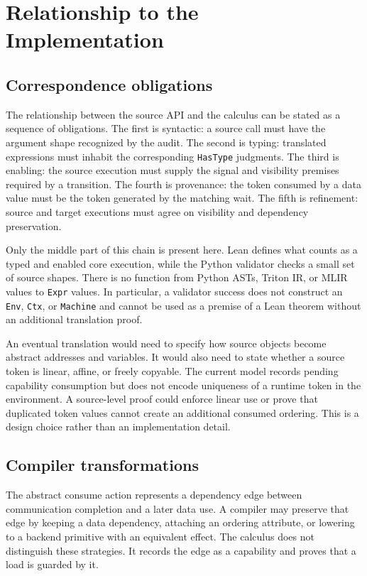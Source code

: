 \documentclass[a4paper,USenglish]{lipics-v2021}
\begin{document}
\section{Relationship to the Implementation}
\subsection{Correspondence obligations}
The relationship between the source API and the calculus can be stated as a
sequence of obligations. The first is syntactic: a source call must have the
argument shape recognized by the audit. The second is typing: translated
expressions must inhabit the corresponding \texttt{HasType} judgments. The
third is enabling: the source execution must supply the signal and visibility
premises required by a transition. The fourth is provenance: the token
consumed by a data value must be the token generated by the matching wait. The
fifth is refinement: source and target executions must agree on visibility and
dependency preservation.

Only the middle part of this chain is present here. Lean defines what counts
as a typed and enabled core execution, while the Python validator checks a
small set of source shapes. There is no function from Python ASTs, Triton IR,
or MLIR values to \texttt{Expr} values. In particular, a validator success
does not construct an \texttt{Env}, \texttt{Ctx}, or \texttt{Machine} and
cannot be used as a premise of a Lean theorem without an additional
translation proof.

An eventual translation would need to specify how source objects become
abstract addresses and variables. It would also need to state whether a
source token is linear, affine, or freely copyable. The current model records
pending capability consumption but does not encode uniqueness of a runtime
token in the environment. A source-level proof could enforce linear use or
prove that duplicated token values cannot create an additional consumed
ordering. This is a design choice rather than an implementation detail.

\subsection{Compiler transformations}
The abstract consume action represents a dependency edge between communication
completion and a later data use. A compiler may preserve that edge by keeping
a data dependency, attaching an ordering attribute, or lowering to a backend
primitive with an equivalent effect. The calculus does not distinguish these
strategies. It records the edge as a capability and proves that a load is
guarded by it.
\end{document}
